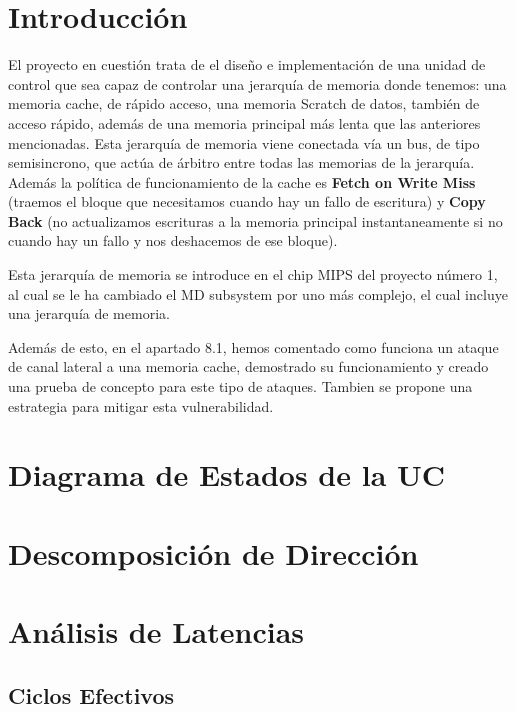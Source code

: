 \documentclass{article}
\begin{document}
\newpage

\tableofcontents

\newpage
\section{Introducción}
El proyecto en cuestión trata de el diseño e implementación de una unidad de control que sea capaz de controlar una jerarquía de memoria
donde tenemos: una memoria cache, de rápido acceso, una memoria Scratch de datos, también de acceso rápido, además de una memoria principal más lenta que las anteriores mencionadas.
Esta jerarquía de memoria viene conectada vía un bus, de tipo semisincrono, que actúa de árbitro entre todas las memorias de la jerarquía. Además la política de funcionamiento de la cache es \textbf{Fetch on Write Miss} (traemos el bloque que necesitamos cuando hay un fallo de escritura)
y \textbf{Copy Back} (no actualizamos escrituras a la memoria principal instantaneamente si no cuando hay un fallo y nos deshacemos de ese bloque). \par
Esta jerarquía de memoria se introduce en el chip MIPS del proyecto número 1, al cual se le ha cambiado el MD subsystem por uno más complejo, el cual incluye una jerarquía de memoria.\par
Además de esto, en el apartado 8.1, hemos comentado como funciona un ataque de canal lateral a una memoria cache, demostrado su funcionamiento y creado una prueba de concepto para este tipo de ataques. Tambien se propone una estrategia para mitigar esta vulnerabilidad.

\section{Diagrama de Estados de la UC}
\lipsum[1-3] %

\section{Descomposición de Dirección}
\lipsum[4-6] %

\section{Análisis de Latencias}
\lipsum[6-8] %
\subsection{Ciclos Efectivos}
\lipsum[9-10]
\end{document}
